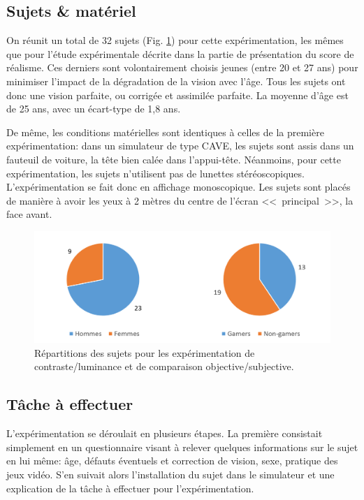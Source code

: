 	\subsection{Sujets \& matériel}
	\par On réunit un total de 32 sujets (Fig. \ref{fig:expe_sujets}) pour cette expérimentation, les mêmes que pour l'étude expérimentale décrite dans la partie de présentation du score de réalisme. Ces derniers sont volontairement choisis jeunes (entre 20 et 27 ans) pour minimiser l'impact de la dégradation de la vision avec l'âge. Tous les sujets ont donc une vision parfaite, ou corrigée et assimilée parfaite. La moyenne d'âge est de 25 ans, avec un écart-type de 1,8 ans.
	
	\par De même, les conditions matérielles sont identiques à celles de la première expérimentation: dans un simulateur de type CAVE, les sujets sont assis dans un fauteuil de voiture, la tête bien calée dans l'appui-tête. Néanmoins, pour cette expérimentation, les sujets n'utilisent pas de lunettes stéréoscopiques. L'expérimentation se fait donc en affichage monoscopique. Les sujets sont placés de manière à avoir les yeux à 2 mètres du centre de l'écran <<~principal~>>, la face avant.
	
	\begin{figure}[h][h]
		\centering
		\includegraphics[scale=0.8]{Figures/SubjectsCharts}
		\caption{Répartitions des sujets pour les expérimentation de contraste/luminance et de comparaison objective/subjective.}
		\label{fig:expe_sujets}
	\end{figure}
	
	\subsection{Tâche à effectuer}
	\par L'expérimentation se déroulait en plusieurs étapes. La première consistait simplement en un questionnaire visant à relever quelques informations sur le sujet en lui même: âge, défauts éventuels et correction de vision, sexe, pratique des jeux vidéo. S'en suivait alors l'installation du sujet dans le simulateur et une explication de la tâche à effectuer pour l'expérimentation.
	
